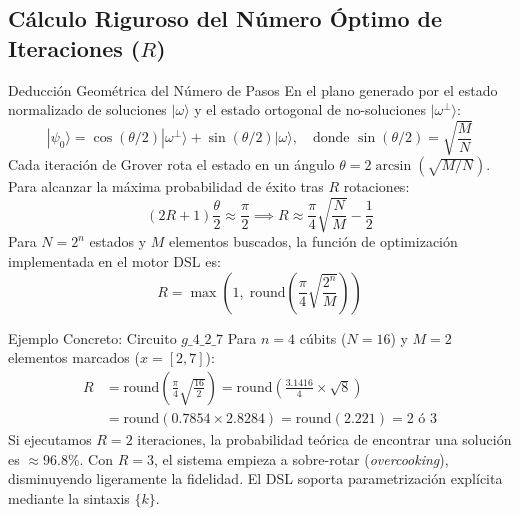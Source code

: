 \documentclass[11pt,a4paper]{article}
\begin{document}
\subsection{Cálculo Riguroso del Número Óptimo de Iteraciones \texorpdfstring{($R$)}{(R)}}

\begin{mathdefbox}{Deducción Geométrica del Número de Pasos}
En el plano generado por el estado normalizado de soluciones $|\omega\rangle$ y el estado ortogonal de no-soluciones $|\omega^\perp\rangle$:
\begin{equation}
    |\psi_0\rangle = \cos(\theta/2)|\omega^\perp\rangle + \sin(\theta/2)|\omega\rangle, \quad \text{donde } \sin(\theta/2) = \sqrt{\frac{M}{N}}
\end{equation}
Cada iteración de Grover rota el estado en un ángulo $\theta = 2 \arcsin(\sqrt{M/N})$. Para alcanzar la máxima probabilidad de éxito tras $R$ rotaciones:
\begin{equation}
    (2R + 1)\frac{\theta}{2} \approx \frac{\pi}{2} \implies R \approx \frac{\pi}{4}\sqrt{\frac{N}{M}} - \frac{1}{2}
\end{equation}
Para $N = 2^n$ estados y $M$ elementos buscados, la función de optimización implementada en el motor DSL es:
\begin{equation}
    R = \max\left(1, \; \text{round}\left( \frac{\pi}{4} \sqrt{\frac{2^n}{M}} \right) \right)
\end{equation}
\end{mathdefbox}

\begin{justificationbox}{Ejemplo Concreto: Circuito \texorpdfstring{$g\_4\_2\_7$}{g\_4\_2\_7}}
Para $n=4$ cúbits ($N=16$) y $M=2$ elementos marcados ($x=[2, 7]$):
\begin{align}
    R &= \text{round}\left( \frac{\pi}{4} \sqrt{\frac{16}{2}} \right) = \text{round}\left( \frac{3.1416}{4} \times \sqrt{8} \right) \nonumber \\
      &= \text{round}(0.7854 \times 2.8284) = \text{round}(2.221) = 2 \text{ ó } 3
\end{align}
Si ejecutamos $R=2$ iteraciones, la probabilidad teórica de encontrar una solución es $\approx 96.8\%$. Con $R=3$, el sistema empieza a sobre-rotar (\textit{overcooking}), disminuyendo ligeramente la fidelidad. El DSL soporta parametrización explícita mediante la sintaxis $\{k\}$.
\end{justificationbox}

\end{document}
